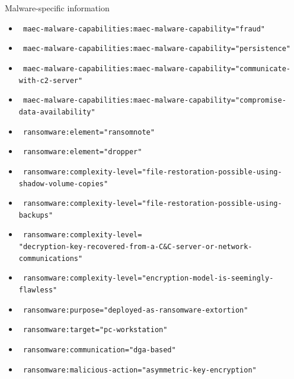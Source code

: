 \begin{frame}
    Malware-specific information
    \begin{itemize}
        \item \texttt{\color{black} \scriptsize maec-malware-capabilities:maec-malware-capability="fraud"}
        \item \texttt{\color{black} \tiny maec-malware-capabilities:maec-malware-capability="persistence"}
        \item \texttt{\color{black} \tiny maec-malware-capabilities:maec-malware-capability="communicate-with-c2-server"}
        \item \texttt{\color{black} \tiny maec-malware-capabilities:maec-malware-capability="compromise-data-availability"}
        \item \texttt{\color{black} \scriptsize ransomware:element="ransomnote"}
        \item \texttt{\color{black} \scriptsize ransomware:element="dropper"}
        \item \texttt{\color{black} \tiny ransomware:complexity-level="file-restoration-possible-using-shadow-volume-copies"}
        \item \texttt{\color{black} \tiny ransomware:complexity-level="file-restoration-possible-using-backups"}
        \item \texttt{\color{black} \tiny ransomware:complexity-level=\\ "decryption-key-recovered-from-a-C\&C-server-or-network-communications"}
        \item \texttt{\color{black} \tiny ransomware:complexity-level="encryption-model-is-seemingly-flawless"}
        \item \texttt{\color{black} \scriptsize ransomware:purpose="deployed-as-ransomware-extortion"}
        \item \texttt{\color{black} \scriptsize ransomware:target="pc-workstation"}
        \item \texttt{\color{black} \scriptsize ransomware:communication="dga-based"}
        \item \texttt{\color{black} \scriptsize ransomware:malicious-action="asymmetric-key-encryption"}
    \end{itemize}
\end{frame}

